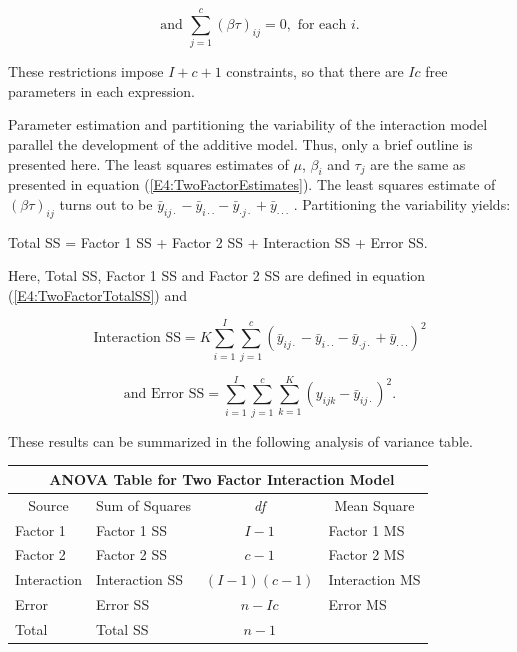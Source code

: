 \begin{equation*}
\text{and }\sum_{j=1}^{c}(\beta \tau )_{ij}=0,\text{ \ for each }i.
\end{equation*}

\noindent These restrictions impose $I+c+1$ constraints, so that
there are $Ic$ free parameters in each expression.

Parameter estimation and partitioning the variability of the
interaction model parallel the development of the additive model.
Thus, only a brief outline is presented here. The least squares
estimates of $\mu $, $\beta_i $ and $\tau_{j}$ are the same as
presented in equation (\ref{E4:TwoFactorEstimates}). The least
squares estimate of $(\beta \tau )_{ij}$ turns out to be $\bar{y}_{ij\cdot }-%
\bar{y}_{i\cdot \cdot }-\bar{y}_{\cdot j\cdot }+\bar{y}_{\cdot \cdot \cdot }$%
. Partitioning the variability yields:

\begin{center}
Total SS = Factor 1 SS + Factor 2 SS + Interaction SS + Error SS.
\end{center}

Here, Total SS, Factor 1 SS and Factor 2 SS are defined in equation
(\ref{E4:TwoFactorTotalSS}) and

\begin{equation*}
\text{Interaction SS}=K\sum_{i=1}^{I}\sum_{j=1}^{c}(\bar{y}_{ij\cdot }-\bar{y%
}_{i\cdot \cdot }-\bar{y}_{\cdot j\cdot }+\bar{y}_{\cdot \cdot \cdot
})^{2}
\end{equation*}

\begin{equation*}
\text{and \ \  Error SS}=\sum_{i=1}^{I}\sum_{j=1}^{c}\sum_{k=1}^{K}(y_{ijk}-%
\bar{y}_{ij\cdot })^{2}.
\end{equation*}

These results can be summarized in the following analysis of
variance table.

\begin{center}
\begin{tabular}{cccc}
\multicolumn{4}{c}{\textbf{\ }ANOVA Table for Two Factor Interaction Model} \\

\hline Source & Sum of Squares & \textit{df} & Mean Square \\ \hline
\multicolumn{1}{l}{Factor 1} & \multicolumn{1}{l}{Factor 1 SS} &
$I-1$ &
\multicolumn{1}{l}{Factor 1 MS} \\
\multicolumn{1}{l}{Factor 2} & \multicolumn{1}{l}{Factor 2 SS} &
$c-1$ &
\multicolumn{1}{l}{Factor 2 MS} \\
\multicolumn{1}{l}{Interaction} & \multicolumn{1}{l}{Interaction SS} & $%
(I-1)(c-1)$ & \multicolumn{1}{l}{Interaction MS} \\
\multicolumn{1}{l}{Error} & \multicolumn{1}{l}{Error SS} & $n-Ic$ &
\multicolumn{1}{l}{Error MS} \\
\multicolumn{1}{l}{Total} & \multicolumn{1}{l}{Total SS} & $n-1$ &
\multicolumn{1}{l}{} \\ \hline
\end{tabular}
\end{center}

